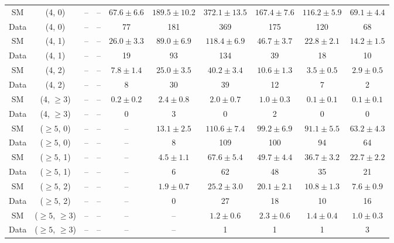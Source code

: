 \begin{table}[h!]
{\begin{tabular}{cccccccccc}
	SM & (4, 0) & -- & -- & $67.6\pm 6.6$ & $189.5\pm 10.2$ & $372.1\pm 13.5$ & $167.4\pm 7.6$ & $116.2\pm 5.9$ & $69.1\pm 4.4$ \\[0.5ex] 
	Data & (4, 0) & -- & -- & 77 & 181 & 369 & 175 & 120 & 68 \\[0.5ex] 
	SM & (4, 1) & -- & -- & $26.0\pm 3.3$ & $89.0\pm 6.9$ & $118.4\pm 6.9$ & $46.7\pm 3.7$ & $22.8\pm 2.1$ & $14.2\pm 1.5$ \\[0.5ex] 
	Data & (4, 1) & -- & -- & 19 & 93 & 134 & 39 & 18 & 10 \\[0.5ex] 
	SM & (4, 2) & -- & -- & $7.8\pm 1.4$ & $25.0\pm 3.5$ & $40.2\pm 3.4$ & $10.6\pm 1.3$ & $3.5\pm 0.5$ & $2.9\pm 0.5$ \\[0.5ex] 
	Data & (4, 2) & -- & -- & 8 & 30 & 39 & 12 & 7 & 2 \\[0.5ex] 
	SM & (4, $\ge3$) & -- & -- & $0.2\pm 0.2$ & $2.4\pm 0.8$ & $2.0\pm 0.7$ & $1.0\pm 0.3$ & $0.1\pm 0.1$ & $0.1\pm 0.1$ \\[0.5ex] 
	Data & (4, $\ge3$) & -- & -- & 0 & 3 & 0 & 2 & 0 & 0 \\[0.5ex] 
	SM & ($\ge5$, 0) & -- & -- & -- & $13.1\pm 2.5$ & $110.6\pm 7.4$ & $99.2\pm 6.9$ & $91.1\pm 5.5$ & $63.2\pm 4.3$ \\[0.5ex] 
	Data & ($\ge5$, 0) & -- & -- & -- & 8 & 109 & 100 & 94 & 64 \\[0.5ex] 
	SM & ($\ge5$, 1) & -- & -- & -- & $4.5\pm 1.1$ & $67.6\pm 5.4$ & $49.7\pm 4.4$ & $36.7\pm 3.2$ & $22.7\pm 2.2$ \\[0.5ex] 
	Data & ($\ge5$, 1) & -- & -- & -- & 6 & 62 & 48 & 35 & 21 \\[0.5ex] 
	SM & ($\ge5$, 2) & -- & -- & -- & $1.9\pm 0.7$ & $25.2\pm 3.0$ & $20.1\pm 2.1$ & $10.8\pm 1.3$ & $7.6\pm 0.9$ \\[0.5ex] 
	Data & ($\ge5$, 2) & -- & -- & -- & 0 & 27 & 18 & 10 & 16 \\[0.5ex] 
	SM & ($\ge5$, $\ge3$) & -- & -- & -- & -- & $1.2\pm 0.6$ & $2.3\pm 0.6$ & $1.4\pm 0.4$ & $1.0\pm 0.3$ \\[0.5ex] 
	Data & ($\ge5$, $\ge3$) & -- & -- & -- & -- & 1 & 1 & 1 & 3 \\[0.5ex] 
	\hline
	\hline
\end{tabular}}
\end{table}
